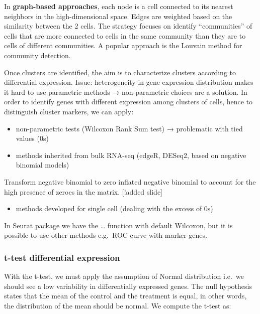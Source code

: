 In \textbf{graph-based approaches}, each node is a cell connected to its
nearest neighbors in the high-dimensional space. Edges are weighted
based on the similarity between the 2 cells. The strategy focuses on
identify ``communities'' of cells that are more connected to cells in
the same community than they are to cells of different communities. A
popular approach is the Louvain method for community detection.

Once clusters are identified, the aim is to characterize clusters
according to differential expression. Issue: heterogeneity in gene
expression distribution makes it hard to use parametric methods →
non-parametric choices are a solution. In order to identify genes with
different expression among clusters of cells, hence to distinguish
cluster markers, we can apply:

\begin{itemize}
\tightlist
\item
  non-parametric tests (Wilcoxon Rank Sum test) → problematic with tied
  values (0s)
\item
  methods inherited from bulk RNA-seq (edgeR, DESeq2, based on negative
  binomial models)
\end{itemize}

Transform negative binomial to zero inflated negative binomial to
account for the high presence of zeroes in the matrix. {[}!added
slide{]}

\begin{itemize}
\tightlist
\item
  methods developed for single cell (dealing with the excess of 0s)
\end{itemize}

In Seurat package we have the \ldots{} function with default Wilcoxon,
but it is possible to use other methods e.g.~ROC curve with marker
genes.

\hypertarget{t-test-differential-expression}{%
\subsubsection{t-test differential
expression}\label{t-test-differential-expression}}

With the t-test, we must apply the assumption of Normal distribution
i.e.~we should see a low variability in differentially expressed genes.
The null hypothesis states that the mean of the control and the
treatment is equal, in other words, the distribution of the mean should
be normal. We compute the t-test as:

